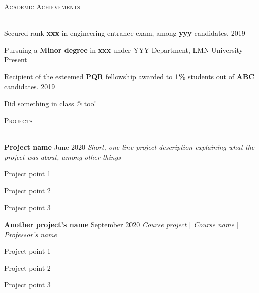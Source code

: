 \documentclass[12pt]{article}   %
\makeatletter
\renewcommand{\section}[1]{
    \textsc{#1}
    \vspace*{-10pt} \\ \hspace*{-5pt} 
    \hrulefill \\
    \vspace*{-15pt}
}
\newcommand{\smallbullet}{
    \small$\bullet$
}
\newenvironment{bullet-list-major}{
    \begin{list}{
        \smallbullet
    }{
        \setlength\leftmargin{15pt}\topsep 0pt \itemsep -4pt
    }
} {
    \end{list}
}
\newcommand{\bigblock}[3]{
    {
        \hspace*{5pt} \textbf{#1} \hfill #2 \newline
        \hspace*{5pt} \textit{#3}
    }
}
\newenvironment{bullet-list-minor}{
    \begin{list}{
        \smallbullet
    }{
        \setlength\leftmargin{30pt}\topsep 0pt \itemsep -3pt
    }
} {
    \end{list}
}
\newcommand{\schoolclass}[1]{\expandafter\@slowromancap\romannumeral #1@}
\makeatother
\begin{document}
    \vspace*{48.63mm}   %



    \section{Academic Achievements}
    \begin{bullet-list-major}
        \item Secured rank \textbf{xxx} in engineering entrance exam, among \textbf{yyy} candidates. \hfill 2019
        \item Pursuing a \textbf{Minor degree} in \textbf{xxx} under YYY Department, LMN University \hfill Present
        \item Recipient of the esteemed \textbf{PQR} fellowship awarded to \textbf{1\%} students out
        of \textbf{ABC} candidates. \hfill 2019
        \item Did something in class \schoolclass{9} too!
    \end{bullet-list-major}


    \section{Projects}

    \bigblock{
        Project name
    }{
        June 2020
    }{
        Short, one-line project description explaining what the project was about, among other things
    }
	\begin{bullet-list-minor}
        \item Project point 1
        \item Project point 2
        \item Project point 3
    \end{bullet-list-minor}
    

    \bigblock{
        Another project's name
    }{
        September 2020
    }{
        Course project \(|\) Course name \(|\) Professor's name
    }
	\begin{bullet-list-minor}
        \item Project point 1
        \item Project point 2
        \item Project point 3
    \end{bullet-list-minor}
\end{document}
